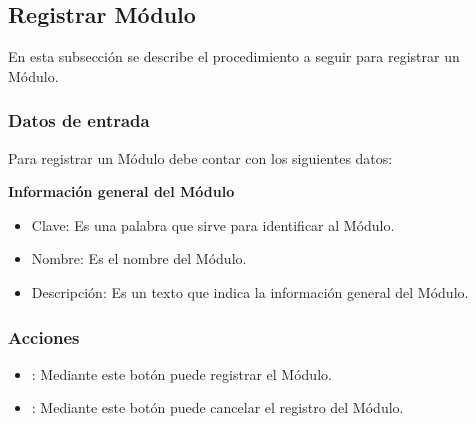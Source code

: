 \subsection{Registrar Módulo}

En esta subsección se describe el procedimiento a seguir para registrar un Módulo.


\subsubsection{Datos de entrada}
\begin{description}
	\item Para registrar un Módulo debe contar con los siguientes datos: \hspace{10pt}
	
	\begin{description}
	    \item \textbf{Información general del Módulo}
	    \begin{itemize}
		  \item Clave: Es una palabra que sirve para identificar al Módulo.
		  \item Nombre: Es el nombre del Módulo.
		  \item Descripción: Es un texto que indica la información general del Módulo.
	    \end{itemize}
	 \end{description}
\end{description}

\subsubsection{Acciones}
\begin{itemize}
  \item {}: Mediante este botón puede registrar el Módulo.
  \item {}: Mediante este botón puede cancelar el registro del Módulo.
\end{itemize}



